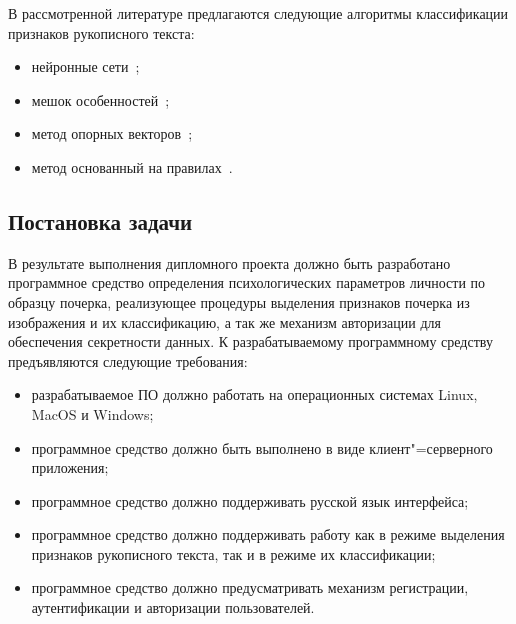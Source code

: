 В рассмотренной литературе предлагаются следующие алгоритмы классификации признаков рукописного текста:
\begin{itemize}
  \item нейронные сети~\cite{champa_ananda_kumar_ann, grewal_prashar, gabrani_solomon_dviwe,puri_lakhwani, dang_kumar, kathait_singh};
  \item мешок особенностей~\cite{rothacker_bag_of_features};
  \item метод опорных векторов~\cite{slideshare_khandelwal_garg, gabrani_solomon_dviwe, prasad_singh_sapre};
  \item метод основанный на правилах~\cite{champa_ananda_kumar_rule_base}.
\end{itemize}


\subsection{Постановка задачи}
В результате выполнения дипломного проекта должно быть разработано программное средство определения психологических параметров личности по образцу почерка, реализующее процедуры выделения признаков почерка из изображения и их классификацию, а так же механизм авторизации для обеспечения секретности данных. К разрабатываемому программному средству предъявляются следующие требования:
\begin{itemize}
\item разрабатываемое ПО должно работать на операционных системах Linux, MacOS и Windows;
\item программное средство должно быть выполнено в виде клиент"=серверного приложения;
\item программное средство должно поддерживать русской язык интерфейса;
\item программное средство должно поддерживать работу как в режиме выделения признаков рукописного текста, так и в режиме их классификации;
\item программное средство должно предусматривать механизм регистрации, аутентификации и авторизации пользователей.
\end{itemize}
